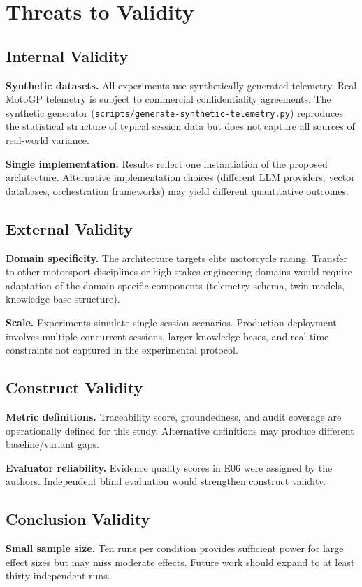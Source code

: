 \section{Threats to Validity}
\label{sec:threats-to-validity}

\subsection{Internal Validity}

\textbf{Synthetic datasets.} All experiments use synthetically generated
telemetry. Real MotoGP telemetry is subject to commercial confidentiality
agreements. The synthetic generator (\texttt{scripts/generate-synthetic-telemetry.py})
reproduces the statistical structure of typical session data but does not capture
all sources of real-world variance.

\textbf{Single implementation.} Results reflect one instantiation of the proposed
architecture. Alternative implementation choices (different LLM providers, vector
databases, orchestration frameworks) may yield different quantitative outcomes.

\subsection{External Validity}

\textbf{Domain specificity.} The architecture targets elite motorcycle racing.
Transfer to other motorsport disciplines or high-stakes engineering domains would
require adaptation of the domain-specific components (telemetry schema, twin
models, knowledge base structure).

\textbf{Scale.} Experiments simulate single-session scenarios. Production deployment
involves multiple concurrent sessions, larger knowledge bases, and real-time
constraints not captured in the experimental protocol.

\subsection{Construct Validity}

\textbf{Metric definitions.} Traceability score, groundedness, and audit coverage
are operationally defined for this study. Alternative definitions may produce
different baseline/variant gaps.

\textbf{Evaluator reliability.} Evidence quality scores in E06 were assigned by
the authors. Independent blind evaluation would strengthen construct validity.

\subsection{Conclusion Validity}

\textbf{Small sample size.} Ten runs per condition provides sufficient power for
large effect sizes but may miss moderate effects. Future work should expand to
at least thirty independent runs.
